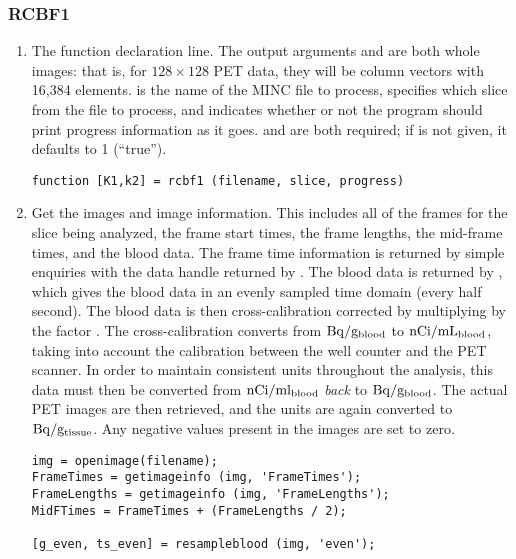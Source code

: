 \subsubsection{RCBF1}
\label{sec:rcbf1_listing}

\begin{enumerate}

\item The function declaration line.  The output arguments 
  and  are both whole images: that is, for $128 \times 128$
  PET data, they will be column vectors with 16,384 elements.
   is the name of the MINC file to process,
   specifies which slice from the file to process, and
   indicates whether or not the program should print
  progress information as it goes.   and 
  are both required; if  is not given, it defaults to 1
  (``true'').  
\begin{verbatim}
function [K1,k2] = rcbf1 (filename, slice, progress)
\end{verbatim}

\item Get the images and image information.  This includes all of the
  frames for the slice being analyzed, the frame start times, the
  frame lengths, the mid-frame times, and the blood data.  The frame
  time information is returned by simple enquiries with the data
  handle  returned by .  The blood data is
  returned by , which gives the blood data in an
  evenly sampled time domain (every half second).  The blood data is
  then cross-calibration corrected by multiplying by the factor
  .  The cross-calibration converts from ${\rm Bq} /
  {\rm g_{blood}}$ to ${\rm nCi} / {\rm mL_{blood}}$, taking into
  account the calibration between the well counter and the PET
  scanner.  In order to maintain consistent units throughout the
  analysis, this data must then be converted from ${\rm nCi / ml_{blood}}$
  {\em back} to ${\rm Bq} / {\rm g_{blood}}$.  The actual PET
  images are then retrieved, and the units are again converted to
  ${\rm Bq} / {\rm g_{tissue}}$.  Any negative values present in
  the images are set to zero.
\begin{verbatim}
img = openimage(filename);
FrameTimes = getimageinfo (img, 'FrameTimes');
FrameLengths = getimageinfo (img, 'FrameLengths');
MidFTimes = FrameTimes + (FrameLengths / 2);

[g_even, ts_even] = resampleblood (img, 'even');


\end{verbatim}
\end{enumerate}
